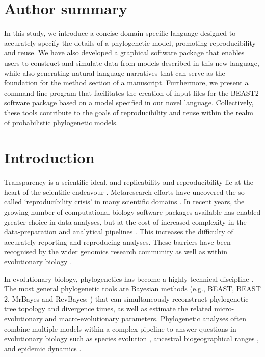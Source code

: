 \documentclass[10pt,letterpaper,table]{article}
\theoremstyle{definition}
\begin{document}
\section*{Author summary}
  In this study, we introduce a concise domain-specific language designed to accurately specify the details of a phylogenetic model, promoting reproducibility and reuse. 
  We have also developed a graphical software package that enables users to construct and simulate data from models described in this new language, while also generating natural language narratives that can serve as the foundation for the method section of a manuscript. 
  Furthermore, we present a command-line program that facilitates the creation of input files for the BEAST2 software package based on a model specified in our novel language. 
  Collectively, these tools contribute to the goals of reproducibility and reuse within the realm of probabilistic phylogenetic models. 


\linenumbers

\section{Introduction}
Transparency is a scientific ideal, and replicability and
reproducibility lie at the heart of the scientific endeavour
\cite{nas19,munafo17}. 
Metaresearch efforts have uncovered the so-called `reproducibility
crisis' \cite{baker16} in many scientific domains \cite{baker16}. 
In recent years, the growing number of computational biology software packages available has enabled greater choice in data analyses, 
but at the cost of increased complexity in the data-preparation and analytical pipelines \cite{eren2021community}. 
This increases the difficulty of accurately reporting and reproducing analyses. 
These barriers have been recognised by the wider genomics research community \cite{eren2021community} as well as within evolutionary biology \cite{oakley2014osiris}. 

In evolutionary biology, phylogenetics has become a highly technical discipline \cite{oakley2014osiris}. 
The most general phylogenetic tools are Bayesian methods (e.g., BEAST, BEAST 2, MrBayes and
RevBayes; \cite{beast,beast2,revbayes,mrbayes}) 
that can simultaneously reconstruct phylogenetic tree topology and divergence times, as well as estimate the related micro-evolutionary and macro-evolutionary parameters. 
Phylogenetic analyses often combine multiple models within a complex pipeline to answer questions in evolutionary biology such as species evolution \cite{gavryushkina17,ogilvie21,zhang21}, 
ancestral biogeographical ranges \cite{lemey10,landis18}, and epidemic dynamics \cite{faria21,douglas21}. 
\end{document}

